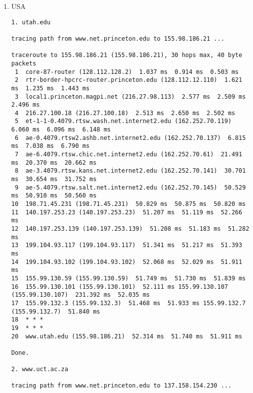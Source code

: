 \documentclass[a4paper]{article}
\begin{document}
\begin{enumerate}
    \item USA
        \begin{lstlisting}
1. utah.edu

tracing path from www.net.princeton.edu to 155.98.186.21 ...

traceroute to 155.98.186.21 (155.98.186.21), 30 hops max, 40 byte packets
 1  core-87-router (128.112.128.2)  1.037 ms  0.914 ms  0.503 ms
 2  rtr-border-hpcrc-router.princeton.edu (128.112.12.110)  1.621 ms  1.235 ms  1.443 ms
 3  local1.princeton.magpi.net (216.27.98.113)  2.577 ms  2.509 ms  2.496 ms
 4  216.27.100.18 (216.27.100.18)  2.513 ms  2.650 ms  2.502 ms
 5  et-1-1-0.4079.rtsw.wash.net.internet2.edu (162.252.70.119)  6.060 ms  6.096 ms  6.148 ms
 6  ae-0.4079.rtsw2.ashb.net.internet2.edu (162.252.70.137)  6.815 ms  7.038 ms  6.790 ms
 7  ae-6.4079.rtsw.chic.net.internet2.edu (162.252.70.61)  21.491 ms  20.370 ms  20.662 ms
 8  ae-3.4079.rtsw.kans.net.internet2.edu (162.252.70.141)  30.701 ms  30.654 ms  31.752 ms
 9  ae-5.4079.rtsw.salt.net.internet2.edu (162.252.70.145)  50.529 ms  50.910 ms  50.560 ms
10  198.71.45.231 (198.71.45.231)  50.829 ms  50.875 ms  50.820 ms
11  140.197.253.23 (140.197.253.23)  51.207 ms  51.119 ms  52.266 ms
12  140.197.253.139 (140.197.253.139)  51.208 ms  51.183 ms  51.282 ms
13  199.104.93.117 (199.104.93.117)  51.341 ms  51.217 ms  51.393 ms
14  199.104.93.102 (199.104.93.102)  52.068 ms  52.029 ms  51.911 ms
15  155.99.130.59 (155.99.130.59)  51.749 ms  51.730 ms  51.839 ms
16  155.99.130.101 (155.99.130.101)  52.111 ms 155.99.130.107 (155.99.130.107)  231.392 ms  52.035 ms
17  155.99.132.3 (155.99.132.3)  51.468 ms  51.933 ms 155.99.132.7 (155.99.132.7)  51.840 ms
18  * * *
19  * * *
20  www.utah.edu (155.98.186.21)  52.314 ms  51.740 ms  51.911 ms

Done. 

2. www.uct.ac.za

tracing path from www.net.princeton.edu to 137.158.154.230 ...


\end{lstlisting}
\end{enumerate}
\end{document}
